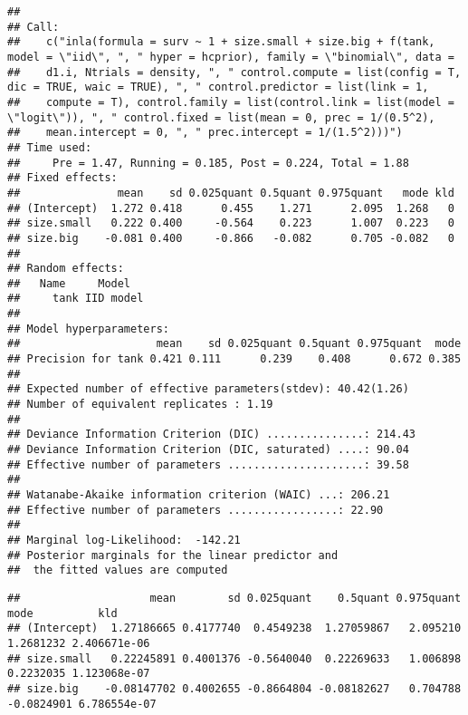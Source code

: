 \documentclass[
]{article}
\newenvironment{Shaded}{\begin{snugshade}}{\end{snugshade}}
\newcommand{\FloatTok}[1]{\textcolor[rgb]{0.00,0.00,0.81}{#1}}
\newcommand{\NormalTok}[1]{#1}
\newcommand{\OperatorTok}[1]{\textcolor[rgb]{0.81,0.36,0.00}{\textbf{#1}}}
\begin{document}
\begin{verbatim}
## 
## Call:
##    c("inla(formula = surv ~ 1 + size.small + size.big + f(tank, model = \"iid\", ", " hyper = hcprior), family = \"binomial\", data = 
##    d1.i, Ntrials = density, ", " control.compute = list(config = T, dic = TRUE, waic = TRUE), ", " control.predictor = list(link = 1, 
##    compute = T), control.family = list(control.link = list(model = \"logit\")), ", " control.fixed = list(mean = 0, prec = 1/(0.5^2), 
##    mean.intercept = 0, ", " prec.intercept = 1/(1.5^2)))") 
## Time used:
##     Pre = 1.47, Running = 0.185, Post = 0.224, Total = 1.88 
## Fixed effects:
##               mean    sd 0.025quant 0.5quant 0.975quant   mode kld
## (Intercept)  1.272 0.418      0.455    1.271      2.095  1.268   0
## size.small   0.222 0.400     -0.564    0.223      1.007  0.223   0
## size.big    -0.081 0.400     -0.866   -0.082      0.705 -0.082   0
## 
## Random effects:
##   Name     Model
##     tank IID model
## 
## Model hyperparameters:
##                     mean    sd 0.025quant 0.5quant 0.975quant  mode
## Precision for tank 0.421 0.111      0.239    0.408      0.672 0.385
## 
## Expected number of effective parameters(stdev): 40.42(1.26)
## Number of equivalent replicates : 1.19 
## 
## Deviance Information Criterion (DIC) ...............: 214.43
## Deviance Information Criterion (DIC, saturated) ....: 90.04
## Effective number of parameters .....................: 39.58
## 
## Watanabe-Akaike information criterion (WAIC) ...: 206.21
## Effective number of parameters .................: 22.90
## 
## Marginal log-Likelihood:  -142.21 
## Posterior marginals for the linear predictor and
##  the fitted values are computed
\end{verbatim}

\begin{Shaded}
\end{Shaded}

\begin{verbatim}
##                    mean        sd 0.025quant    0.5quant 0.975quant       mode          kld
## (Intercept)  1.27186665 0.4177740  0.4549238  1.27059867   2.095210  1.2681232 2.406671e-06
## size.small   0.22245891 0.4001376 -0.5640040  0.22269633   1.006898  0.2232035 1.123068e-07
## size.big    -0.08147702 0.4002655 -0.8664804 -0.08182627   0.704788 -0.0824901 6.786554e-07
\end{verbatim}
\end{document}
